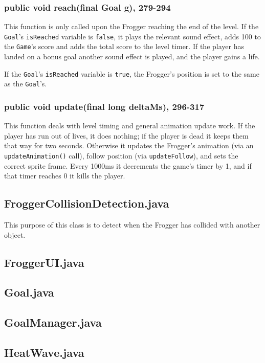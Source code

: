 \documentclass[12pt]{article}
\begin{document}
\subsubsection{public void reach(final Goal g), 279-294}
This function is only called upon the Frogger reaching the end of the level.
If the \verb|Goal|'s \verb|isReached| variable is \verb|false|, it plays the relevant sound effect, adds 100 to the \verb|Game|'s score and adds the total score to the level timer.
If the player has landed on a bonus goal another sound effect is played, and the player gains a life.
\par
If the \verb|Goal|'s \verb|isReached| variable is \verb|true|, the Frogger's position is set to the same as the \verb|Goal|'s.

\subsubsection{public void update(final long deltaMs), 296-317}
This function deals with level timing and general animation update work.
If the player has run out of lives, it does nothing; if the player is dead it keeps them that way for two seconds.
Otherwise it updates the Frogger's animation (via an \verb|updateAnimation()| call), follow position (via \verb|updateFollow|), and sets the correct sprite frame.
Every 1000ms it decrements the game's timer by 1, and if that timer reaches 0 it kills the player.


\subsection{FroggerCollisionDetection.java}
This purpose of this class is to detect when the Frogger has collided with another object.

\subsection{FroggerUI.java}

\subsection{Goal.java}

\subsection{GoalManager.java}

\subsection{HeatWave.java}
\end{document}
